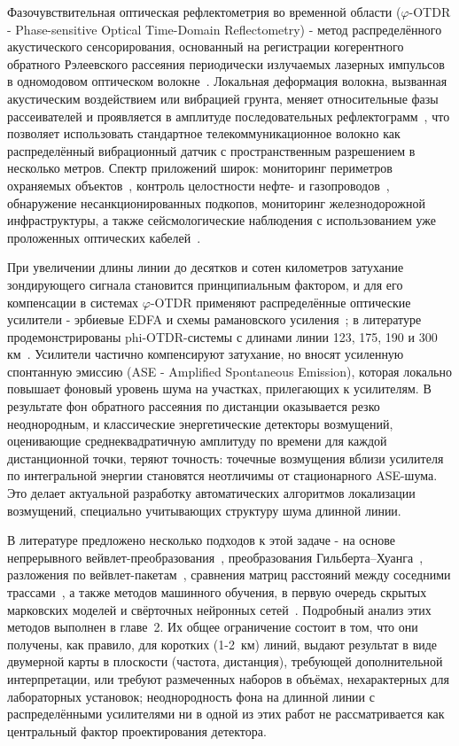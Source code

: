 \documentclass[12pt,a4paper]{extarticle}
\newcommand{\phiOTDR}{$\varphi$-OTDR}
\begin{document}
Фазочувствительная оптическая рефлектометрия во временной области (\phiOTDR{} - Phase-sensitive Optical Time-Domain Reflectometry) - метод распределённого акустического сенсорирования, основанный на регистрации когерентного обратного Рэлеевского рассеяния периодически излучаемых лазерных импульсов в одномодовом оптическом волокне~\cite{Lu2019, Palmieri2013, Bao2012, He2021}. Локальная деформация волокна, вызванная акустическим воздействием или вибрацией грунта, меняет относительные фазы рассеивателей и проявляется в амплитуде последовательных рефлектограмм~\cite{Lu2010, Posey2000}, что позволяет использовать стандартное телекоммуникационное волокно как распределённый вибрационный датчик с пространственным разрешением в несколько метров. Спектр приложений широк: мониторинг периметров охраняемых объектов~\cite{Juarez2005}, контроль целостности нефте- и газопроводов~\cite{Tejedor2017}, обнаружение несанкционированных подкопов, мониторинг железнодорожной инфраструктуры, а также сейсмологические наблюдения с использованием уже проложенных оптических кабелей~\cite{Muanenda2018}.

При увеличении длины линии до десятков и сотен километров затухание зондирующего сигнала становится принципиальным фактором, и для его компенсации в системах \phiOTDR{} применяют распределённые оптические усилители - эрбиевые EDFA и схемы рамановского усиления~\cite{Peng2014, Martins2014, Wang2016}; в литературе продемонстрированы phi-OTDR-системы с длинами линии 123, 175, 190 и 300 км~\cite{Tian2016, WangZN2014, Wang2023, Fan2023}. Усилители частично компенсируют затухание, но вносят усиленную спонтанную эмиссию (ASE - Amplified Spontaneous Emission), которая локально повышает фоновый уровень шума на участках, прилегающих к усилителям. В результате фон обратного рассеяния по дистанции оказывается резко неоднородным, и классические энергетические детекторы возмущений, оценивающие среднеквадратичную амплитуду по времени для каждой дистанционной точки, теряют точность: точечные возмущения вблизи усилителя по интегральной энергии становятся неотличимы от стационарного ASE-шума. Это делает актуальной разработку автоматических алгоритмов локализации возмущений, специально учитывающих структуру шума длинной линии.

В литературе предложено несколько подходов к этой задаче - на основе непрерывного вейвлет-преобразования~\cite{Qin2012}, преобразования Гильберта–Хуанга~\cite{Hui2014}, разложения по вейвлет-пакетам~\cite{Li2014}, сравнения матриц расстояний между соседними трассами~\cite{Liu2018}, а также методов машинного обучения, в первую очередь скрытых марковских моделей и свёрточных нейронных сетей~\cite{Wu2019, Shi2020}. Подробный анализ этих методов выполнен в главе~2. Их общее ограничение состоит в том, что они получены, как правило, для коротких (1-2~км) линий, выдают результат в виде двумерной карты в плоскости (частота, дистанция), требующей дополнительной интерпретации, или требуют размеченных наборов в объёмах, нехарактерных для лабораторных установок; неоднородность фона на длинной линии с распределёнными усилителями ни в одной из этих работ не рассматривается как центральный фактор проектирования детектора.
\end{document}
